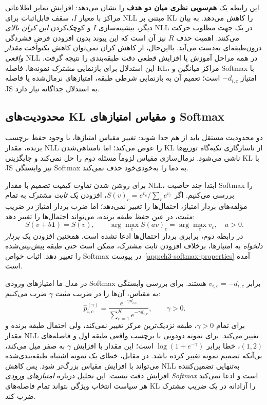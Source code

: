 این رابطه یک \textbf{هم‌سویی نظری میان دو هدف} را نشان می‌دهد:
افزایش تمایز اطلاعاتی مراکز با معیار $I$، سقف قابل‌اثبات
برای NLL مبتنی بر KL را کاهش می‌دهد. به بیان دیگر،
بیشینه‌سازی $I$ و کوچک‌کردن \emph{این کران بالای} NLL
در یک جهت مطلوب حرکت می‌کنند. اهمیت حذف $R$ نیز
آن است که این پیوند بدون افزودن فرضِ فشردگی درون‌طبقه‌ای
به‌دست می‌آید. بااین‌حال، از کاهش کران نمی‌توان
کاهش یکنواخت \emph{مقدار واقعی} NLL در همه مراحل آموزش
یا افزایش قطعی دقت طبقه‌بندی را نتیجه گرفت.
این استدلال برای بازنمایی \emph{مشترک} نمونه‌ها،
فاصله KL، مراکز میانگین و Softmax با امتیاز
$-d_{i,c}$ است؛ تعمیم آن به بازنمایی شرطی طبقه،
امتیازهای نرمال‌شده یا فاصله JS به استدلال جداگانه نیاز دارد.

\subsection{محدودیت‌های KL و مقیاس امتیازهای Softmax}
\label{subsec:ch3-NLL-scaling}

دو محدودیت مستقل باید از هم جدا شوند:
تغییر مقیاس امتیازها، با وجود حفظ برچسب برنده،
مقدار NLL را عوض می‌کند؛ اما نامتناهی‌شدن KL
از ناسازگاری تکیه‌گاه توزیع‌ها ناشی می‌شود.
نرمال‌سازی مقیاس لزوماً مسئله دوم را حل نمی‌کند
و جایگزینی KL با JS نیز وابستگی Softmax
به دما را به‌خودی‌خود حذف نمی‌کند.

برای روشن شدن تفاوت کیفیت تصمیم با مقدار NLL، ابتدا چند خاصیت Softmax را بررسی می‌کنیم. اگر $S(v)_c=e^{v_c}/\sum_re^{v_r}$، افزودن \emph{یک ثابت مشترک} به تمام مؤلفه‌های بردار امتیاز، احتمال‌ها را تغییر نمی‌دهد؛ اما ضرب بردار امتیاز در ضریب مثبت، در عین حفظ طبقه برنده، می‌تواند احتمال‌ها را تغییر دهد:
\begin{equation}\label{eq:ch3-NLL-softmax-invariance}
S(v+b\mathbf1)=S(v),
\qquad
\arg\max_c S(av)_c=\arg\max_c v_c,\quad a>0.
\end{equation}
در رابطه دوم، برابری بردار احتمال‌ها ادعا نشده است. همچنین افزودن یک \emph{بردار دلخواه} به امتیازها، برخلاف افزودن ثابت مشترک، ممکن است حتی طبقه پیش‌بینی‌شده را تغییر دهد. اثبات خواص Softmax در پیوست~\ref{app:ch3-softmax-properties} آمده است.

در مدل ما امتیازهای ورودی Softmax برابر $v_{i,c}=-d_{i,c}$ هستند. برای بررسی وابستگی به مقیاس، آن‌ها را در ضریب مثبت $\gamma$ ضرب می‌کنیم:
\begin{equation}\label{eq:ch3-NLL-scaled-softmax}
\widehat p_{i,c}^{(\gamma)}
=\frac{e^{-\gamma d_{i,c}}}
{\sum_{r=1}^{K}e^{-\gamma d_{i,r}}},\qquad\gamma>0.
\end{equation}
برای تمام $\gamma>0$، طبقه نزدیک‌ترین مرکز تغییر نمی‌کند، ولی احتمال طبقه برنده و مقدار NLL تغییر می‌کند. برای نمونه دودویی با برچسب واقعی طبقه اول و فاصله‌های $(1,2)$، خطا برابر $\log(1+e^{-\gamma})$ است؛ این مقدار با افزایش $\gamma$ به صفر میل می‌کند، بی‌آنکه تصمیم نمونه تغییر کرده باشد. در مقابل، خطای یک نمونه اشتباه طبقه‌بندی‌شده می‌تواند با افزایش مقیاس بزرگ‌تر شود. پس کاهش NLL به‌تنهایی تضمین‌کننده افزایش دقت نیست. این تحلیل درباره \emph{امتیازهای ورودی Softmax} است و ادعا نمی‌کند هر سیاست انتخاب ویژگی بتواند تمام فاصله‌های KL را آزادانه در یک ضریب مشترک ضرب کند.

